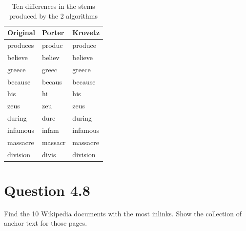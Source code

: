 \documentclass{article}
\begin{document}
	    \begin{table}[b]
	    	\centering
	    	\caption{Ten differences in the stems produced by the 2 algorithms}
	    	\label{tb:term_diffs}
	    	\begin{tabular}{|l|l|l|}
	    		\hline
	    		Original & Porter  & Krovetz  \\ \hline
	    		produces & produc  & produce  \\ 
	    		believe  & believ  & believe  \\ 
	    		greece   & greec   & greece   \\ 
	    		because  & becaus  & because  \\ 
	    		his      & hi      & his      \\ 
	    		zeus     & zeu     & zeus     \\ 
	    		during   & dure    & during   \\ 
	    		infamous & infam   & infamous \\ 
	    		massacre & massacr & massacre \\ 
	    		division & divis   & division \\ \hline
	    	\end{tabular}
	    \end{table}
		
		\section*{Question 4.8}
		Find the 10 Wikipedia documents with the most inlinks. Show the collection of anchor text for those pages.
\end{document}
